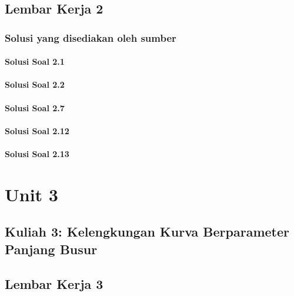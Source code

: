 \documentclass[11pt,a4paper,oneside]{book}
\begin{document}
\chapter{Lembar Kerja 2}


\section*{Solusi yang disediakan oleh sumber}
\subsection*{Solusi Soal 2.1}

\subsection*{Solusi Soal 2.2}

\subsection*{Solusi Soal 2.7}
\begingroup\scriptsize

\endgroup
\subsection*{Solusi Soal 2.12}
\begingroup\small

\endgroup
\subsection*{Solusi Soal 2.13}


\part{Unit 3}
\chapter[Kuliah 3]{Kuliah 3: Kelengkungan Kurva Berparameter Panjang Busur}


\chapter{Lembar Kerja 3}

\end{document}
